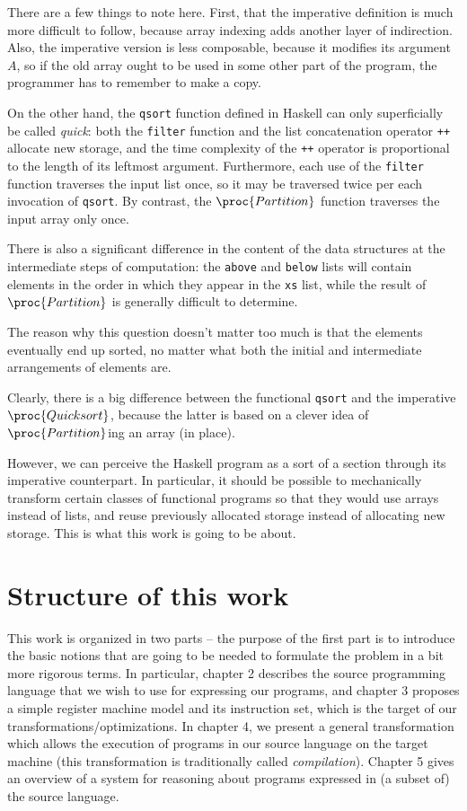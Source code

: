 There are a few things to note here. First, that the imperative definition
is much more difficult to follow, because array indexing adds another
layer of indirection. Also, the imperative version is less composable,
because it modifies its argument $A$, so if the old array ought to be
used in some other part of the program, the programmer has to remember
to make a copy.

On the other hand, the \texttt{qsort} function defined in Haskell
can only superficially be called \emph{quick}: both the \texttt{filter}
function and the list concatenation operator \texttt{++} allocate new
storage, and the time complexity of the \texttt{++} operator is proportional
to the length of its leftmost argument. Furthermore, each use of
the \texttt{filter} function traverses the input list once, so
it may be traversed twice per each invocation of \texttt{qsort}.
By contrast, the $\proc{Partition}$ function traverses
the input array only once.

There is also a significant difference in the content of the data
structures at the intermediate steps of computation: the \texttt{above}
and \texttt{below} lists will contain elements in the order in which
they appear in the \texttt{xs} list, while the result of $\proc{Partition}$
is generally difficult to determine. 

The reason why this question doesn't matter too much is that the elements
eventually end up sorted, no matter what both the initial and intermediate
arrangements of elements are.

Clearly, there is a big difference between the functional \texttt{qsort}
and the imperative $\proc{Quicksort}$, because the latter is based
on a clever idea of $\proc{Partition}$ing an array (in place).

However, we can perceive the Haskell program as a sort of a section through
its imperative counterpart. In particular, it should be possible
to mechanically transform certain classes of functional programs so
that they would use arrays instead of lists, and reuse previously allocated
storage instead of allocating new storage. This is what this work is going to
be about.

\section{Structure of this work}

This work is organized in two parts -- the purpose of the first part
is to introduce the basic notions that are going to be needed
to formulate the problem in a bit more rigorous terms. In particular,
chapter 2 describes the source programming language that we wish to use
for expressing our programs, and chapter 3 proposes a simple register
machine model and its instruction set, which is the target of our
transformations/optimizations. In chapter 4, we present a general
transformation which allows the execution of programs in our source
language on the target machine (this transformation is traditionally
called \textit{compilation}). Chapter 5 gives an overview of a
system for reasoning about programs expressed in (a subset of)
the source language.

